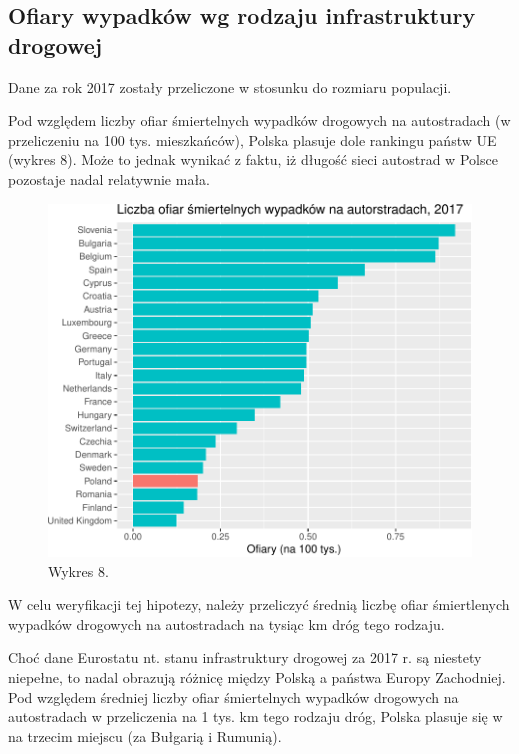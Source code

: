 \documentclass[
]{article}
\begin{document}
\hypertarget{ofiary-wypadkuxf3w-wg-rodzaju-infrastruktury-drogowej}{%
\subsection{Ofiary wypadków wg rodzaju infrastruktury
drogowej}\label{ofiary-wypadkuxf3w-wg-rodzaju-infrastruktury-drogowej}}

Dane za rok 2017 zostały przeliczone w stosunku do rozmiaru populacji.

Pod względem liczby ofiar śmiertelnych wypadków drogowych na
autostradach (w przeliczeniu na 100 tys. mieszkańców), Polska plasuje
dole rankingu państw UE (wykres 8). Może to jednak wynikać z faktu, iż
długość sieci autostrad w Polsce pozostaje nadal relatywnie mała.

\begin{figure}

\includegraphics{raport_wypadki_files/figure-latex/unnamed-chunk-15-1} \hfill{}

\caption{Wykres 8.}\label{fig:unnamed-chunk-15}
\end{figure}

W celu weryfikacji tej hipotezy, należy przeliczyć średnią liczbę ofiar
śmiertlenych wypadków drogowych na autostradach na tysiąc km dróg tego
rodzaju.

Choć dane Eurostatu nt. stanu infrastruktury drogowej za 2017 r. są
niestety niepełne, to nadal obrazują różnicę między Polską a państwa
Europy Zachodniej. Pod względem średniej liczby ofiar śmiertelnych
wypadków drogowych na autostradach w przeliczenia na 1 tys. km tego
rodzaju dróg, Polska plasuje się w na trzecim miejscu (za Bułgarią i
Rumunią).
\end{document}
